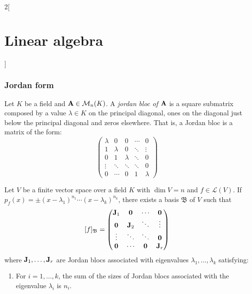 \documentclass[../../../main.tex]{subfiles}
\begin{document}
\begin{multicols}{2}[\section{Linear algebra}]
    \subsubsection*{Jordan form}
    \begin{definition}
        Let $K$ be a field and $\boldsymbol{\mathrm{A}}\in\mathcal{M}_n(K)$. A \textit{jordan bloc of $\boldsymbol{\mathrm{A}}$} is a square submatrix composed by a value $\lambda\in K$ on the principal diagonal, ones on the diagonal just below the principal diagonal and zeros elsewhere. That is, a Jordan bloc is a matrix of the form:
        $$
            \begin{pmatrix}
                \lambda & 0       & 0       & \cdots & 0       \\
                1       & \lambda & 0       & \ddots & \vdots  \\
                0       & 1       & \lambda & \ddots & 0       \\
                \vdots  & \ddots  & \ddots  & \ddots & 0       \\
                0       & \cdots  & 0       & 1      & \lambda
            \end{pmatrix}
        $$
    \end{definition}
    \begin{prop}
        Let $V$ be a finite vector space over a field $K$ with $\dim V=n$ and $f\in\mathcal{L}(V)$. If $p_f(x)=\pm(x-\lambda_1)^{n_1}\cdots(x-\lambda_k)^{n_k}$, there exists a basis $\mathfrak{B}$ of $V$ such that
        $$[f]_{\mathfrak{B}}=
            \begin{pmatrix}
                \boldsymbol{\mathrm{J}}_1 & \boldsymbol{\mathrm{0}}   & \cdots             & \boldsymbol{\mathrm{0}}   \\
                \boldsymbol{\mathrm{0}}   & \boldsymbol{\mathrm{J}}_2 & \ddots             & \vdots               \\
                \vdots               & \ddots               & \ddots             & \boldsymbol{\mathrm{0}}   \\
                \boldsymbol{\mathrm{0}}   & \cdots               & \boldsymbol{\mathrm{0}} & \boldsymbol{\mathrm{J}}_r \\
            \end{pmatrix}
        $$
        where $\boldsymbol{\mathrm{J}}_1,\ldots,\boldsymbol{\mathrm{J}}_r$ are Jordan blocs associated with eigenvalues $\lambda_1,\ldots,\lambda_k$ satisfying:
        \begin{enumerate}
            \item\label{LA_diag1} For $i=1,\ldots,k$, the sum of the sizes of Jordan blocs associated with the eigenvalue $\lambda_i$ is $n_i$.

\end{enumerate}
\end{prop}
\end{multicols}
\end{document}
